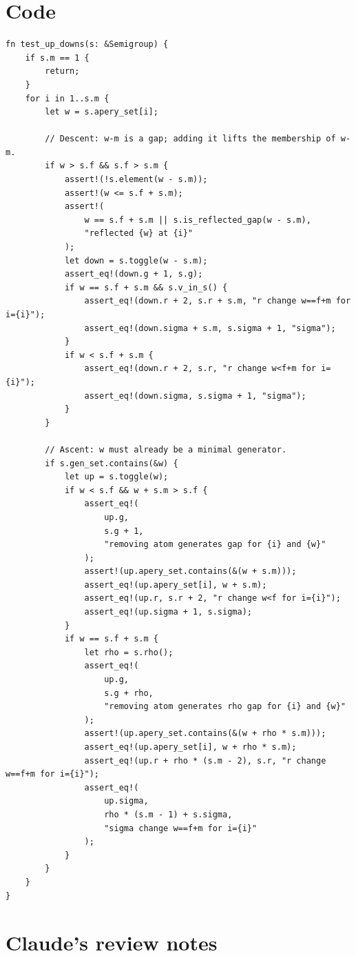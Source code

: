 \documentclass[11pt, a4paper]{article}
\begin{document}
\section{Code}
\begin{verbatim}
fn test_up_downs(s: &Semigroup) {
    if s.m == 1 {
        return;
    }
    for i in 1..s.m {
        let w = s.apery_set[i];

        // Descent: w-m is a gap; adding it lifts the membership of w-m.
        if w > s.f && s.f > s.m {
            assert!(!s.element(w - s.m));
            assert!(w <= s.f + s.m);
            assert!(
                w == s.f + s.m || s.is_reflected_gap(w - s.m),
                "reflected {w} at {i}"
            );
            let down = s.toggle(w - s.m);
            assert_eq!(down.g + 1, s.g);
            if w == s.f + s.m && s.v_in_s() {
                assert_eq!(down.r + 2, s.r + s.m, "r change w==f+m for i={i}");
                assert_eq!(down.sigma + s.m, s.sigma + 1, "sigma");
            }
            if w < s.f + s.m {
                assert_eq!(down.r + 2, s.r, "r change w<f+m for i={i}");
                assert_eq!(down.sigma, s.sigma + 1, "sigma");
            }
        }

        // Ascent: w must already be a minimal generator.
        if s.gen_set.contains(&w) {
            let up = s.toggle(w);
            if w < s.f && w + s.m > s.f {
                assert_eq!(
                    up.g,
                    s.g + 1,
                    "removing atom generates gap for {i} and {w}"
                );
                assert!(up.apery_set.contains(&(w + s.m)));
                assert_eq!(up.apery_set[i], w + s.m);
                assert_eq!(up.r, s.r + 2, "r change w<f for i={i}");
                assert_eq!(up.sigma + 1, s.sigma);
            }
            if w == s.f + s.m {
                let rho = s.rho();
                assert_eq!(
                    up.g,
                    s.g + rho,
                    "removing atom generates rho gap for {i} and {w}"
                );
                assert!(up.apery_set.contains(&(w + rho * s.m)));
                assert_eq!(up.apery_set[i], w + rho * s.m);
                assert_eq!(up.r + rho * (s.m - 2), s.r, "r change w==f+m for i={i}");
                assert_eq!(
                    up.sigma,
                    rho * (s.m - 1) + s.sigma,
                    "sigma change w==f+m for i={i}"
                );
            }
        }
    }
}
\end{verbatim}
\section{Claude's review notes}
\end{document}
